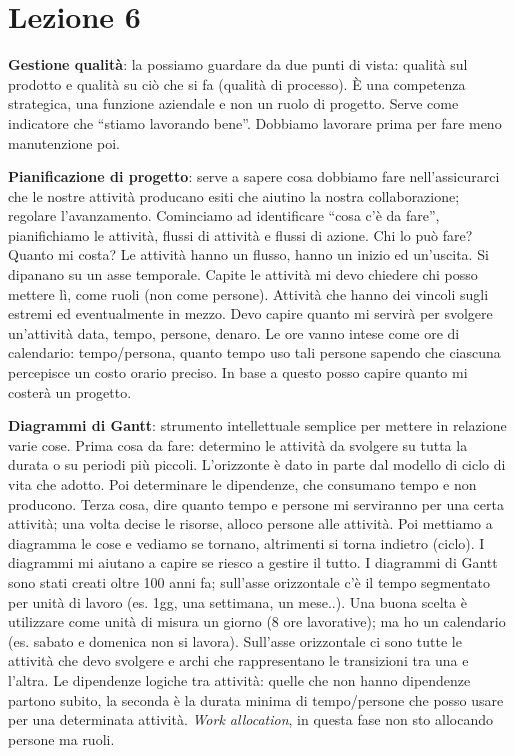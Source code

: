 



\section{Lezione 6}

\textbf{Gestione qualità}: la possiamo guardare da due punti di vista: qualità sul prodotto e qualità su ciò che si fa (qualità di processo). È una competenza strategica, una funzione aziendale e non un ruolo di progetto. Serve come indicatore che ``stiamo lavorando bene''. Dobbiamo lavorare prima per fare meno manutenzione poi.

\textbf{Pianificazione di progetto}: serve a sapere cosa dobbiamo fare nell'assicurarci che le nostre attività producano esiti che aiutino la nostra collaborazione; regolare l'avanzamento. Cominciamo ad identificare ``cosa c'è da fare'', pianifichiamo le attività, flussi di attività e flussi di azione. Chi lo può fare? Quanto mi costa? Le attività hanno un flusso, hanno un inizio ed un'uscita. Si dipanano su un asse temporale. Capite le attività mi devo chiedere chi posso mettere lì, come ruoli (non come persone). Attività che hanno dei vincoli sugli estremi ed eventualmente in mezzo. Devo capire quanto mi servirà per svolgere un'attività data, tempo, persone, denaro. Le ore vanno intese come ore di calendario: tempo/persona, quanto tempo uso tali persone sapendo che ciascuna percepisce un costo orario preciso. In base a questo posso capire quanto mi costerà un progetto.

\textbf{Diagrammi di Gantt}: strumento intellettuale semplice per mettere in relazione varie cose. Prima cosa da fare: determino le attività da svolgere su tutta la durata o su periodi più piccoli. L'orizzonte è dato in parte dal modello di ciclo di vita che adotto. Poi determinare le dipendenze, che consumano tempo e non producono. Terza cosa, dire quanto tempo e persone mi serviranno per una certa attività; una volta decise le risorse, alloco persone alle attività. Poi mettiamo a diagramma le cose e vediamo se tornano, altrimenti si torna indietro (ciclo). I diagrammi mi aiutano a capire se riesco a gestire il tutto. I diagrammi di Gantt sono stati creati oltre 100 anni fa; sull'asse orizzontale c'è il tempo segmentato per unità di lavoro (es. 1gg, una settimana, un mese..). Una buona scelta è utilizzare come unità di misura un giorno (8 ore lavorative); ma ho un calendario (es. sabato e domenica non si lavora). Sull'asse orizzontale ci sono tutte le attività che devo svolgere e archi che rappresentano le transizioni tra una e l'altra. Le dipendenze logiche tra attività: quelle che non hanno dipendenze partono subito, la seconda è la durata minima di tempo/persone che posso usare per una determinata attività. \textit{Work allocation}, in questa fase non sto 
allocando persone ma ruoli.

